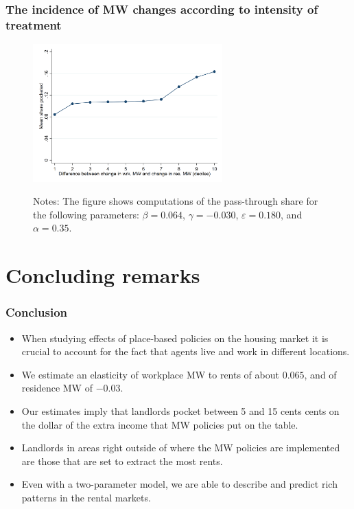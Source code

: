 \documentclass[aspectratio=169, t]{beamer}
\begin{document}
\begin{frame}
    \frametitle{The incidence of MW changes according to intensity of treatment}
    
    \begin{figure}
        \includegraphics[width = 0.65\textwidth]{counterfactuals/output/deciles_diff.png}
        \begin{minipage}{.95\textwidth} \footnotesize
            \vspace{2mm}
            Notes: The figure shows computations of the pass-through share for the following
            parameters: $\beta = 0.064$, $\gamma = -0.030$, $\varepsilon = 0.180$, and $\alpha=0.35$.
        \end{minipage}
    \end{figure}
\end{frame}

\section{Concluding remarks}

\begin{frame}
    \frametitle{Conclusion}
    
    \begin{itemize}
        \item When studying effects of place-based policies on the housing market it is crucial
         to account for the fact that agents live and work in different locations.
         \vspace{1mm}
         \item We estimate an elasticity of workplace MW to rents of about $0.065$, and of residence MW of $-0.03$.
         \vspace{1mm}
         \item Our estimates imply that landlords pocket between 5 and 15 cents cents on the dollar of the extra 
         income that MW policies put on the table.
         \vspace{1mm}
         \item Landlords in areas right outside of where the MW policies are implemented are those that are set to extract the most rents. 
         \item Even with a two-parameter model, we are able to describe and predict rich patterns in the rental markets.
    \end{itemize}
    
\end{frame}
\end{document}
